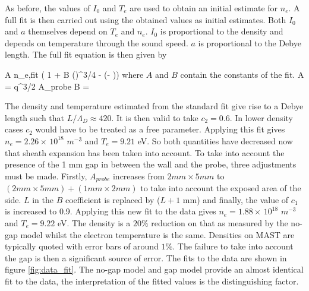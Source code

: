 \ee 
As before, the values of $I_0$ and $T_e$ are used to obtain an initial estimate for $n_e$. A full fit is then carried out using the obtained values as initial estimates. Both $I_0$ and $a$ themselves depend on $T_e$ and $n_e$. $I_0$ is proportional to the density and depends on temperature through the sound speed. $a$ is proportional to the Debye length.  The full fit equation is then given by 


\be 
A n_{e,fit}   \left( 1 +  B       {\left(\right)}^{3/4}  - \exp\left(- \right)\right)
\ee
where $A$ and $B$ contain the constants of the fit.
\be 
 A =  q^{3/2} A_{probe} \sin\theta
\ee 
\be 
B =  
\ee

The density and temperature estimated from the standard fit give rise to a Debye length such that $L/\Lambda_D \approx 420$. It is then valid to take $c_2 = 0.6$. In lower density cases $c_2$ would have to be treated as a free parameter.
Applying this fit gives $n_e = 2.26 \times \, 10^{18}$ $m^{-3}$ and $T_e = 9.21$ eV. So both quantities have decreased now that sheath expansion has been taken into account. To take into account the presence of the 1 mm gap in between the wall and the probe, three adjustments must be made. Firstly, $A_{probe}$ increases from $2 mm \times 5 mm$ to $(2 mm \times 5 mm) + (1 mm \times 2mm) $ to take into account the exposed area of the side. $L$ in the $B$ coefficient is replaced by ($L + 1$ mm) and finally, the value of $c_1$ is increased to 0.9. Applying this new fit to the data gives $n_e = 1.88 \times \, 10^{18}$ $m^{-3}$ and $T_e = 9.22$ eV. The density is a $20 \%$ reduction on that as measured by the no-gap model whilst the electron temperature is the same. Densities on MAST are typically quoted with error bars of around $1 \%$. The failure to take into account the gap is then a significant source of error. The fits to the data are shown in figure \ref{fig:data_fit}. The no-gap model and gap model provide an almost identical fit to the data, the interpretation of the fitted values is the distinguishing factor.

